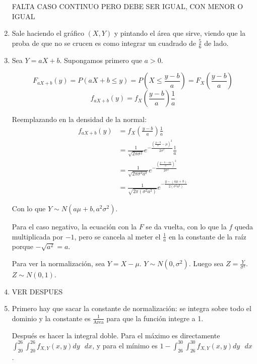 \begin{enumerate}
		FALTA CASO CONTINUO PERO DEBE SER IGUAL, CON MENOR O IGUAL
		
	\item
		Sale haciendo el gráfico $(X,Y)$ y pintando el área que sirve, viendo que la proba de que no se crucen es como integrar un cuadrado de $\frac{5}{6}$ de lado.
		
	\item
		Sea $Y=aX+b$.
		Supongamos primero que $a>0$.
		
		$$F_{aX+b}(y) = P(aX+b \leq y) = P\left(X \leq \frac{y-b}{a}\right) = F_X\left(\frac{y-b}{a}\right)$$
		$$f_{aX+b}(y) = f_X\left(\frac{y-b}{a}\right)\frac{1}{a}$$
		
		Reemplazando en la densidad de la normal:
		\begin{align*}
			f_{aX+b}(y)	& = f_X\left(\frac{y-b}{a}\right)\frac{1}{a}																\\
						& = \frac{1}{\sqrt{2\pi \sigma^2}} e^{-\frac{\left(\frac{y-b}{a} - \mu\right)^2}{2\sigma^2}} \frac{1}{a}	\\
						& = \frac{1}{\sqrt{2\pi \sigma^2 a^2}} e^{-\frac{\left(\frac{y-b-a\mu}{a}\right)^2}{2\sigma^2}}				\\
						& = \frac{1}{\sqrt{2\pi (\sigma^2 a^2)}} e^{-\frac{y-(a\mu+b)}{2(\sigma^2a^2)}}
		\end{align*}
		
		Con lo que $Y \sim N(a\mu + b, a^2\sigma^2)$.
		
		Para el caso negativo, la ecuación con la $F$ se da vuelta, con lo que la $f$ queda multiplicada por $-1$,
		pero se cancela al meter el $\frac{1}{a}$ en la constante de la raíz porque $-\sqrt{a^2} = a$.
		
		Para ver la normalización, sea $Y = X - \mu$. $Y\sim N(0, \sigma^2)$. Luego sea $Z=\frac{Y}{\sigma^2}$. $Z\sim N(0,1)$.
	
	\item
		VER DESPUES
		
	\item
		Primero hay que sacar la constante de normalización: se integra sobre todo el dominio y la constante es $\frac{1}{\text{Area}}$ para que la función integre a 1.
		
		Después es hacer la integral doble. Para el máximo es directamente $\int_{20}^{26}\int_{20}^{26} f_{X,Y}(x,y) dy\text{ }dx$,
		y para el mínimo es $1 - \int_{26}^{30}\int_{26}^{30} f_{X,Y}(x,y) dy\text{ }dx$.
\end{enumerate}
